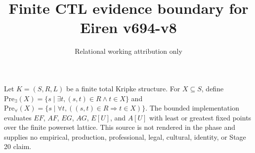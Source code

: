 \documentclass{article}
\title{Finite CTL evidence boundary for Eiren v694-v8}
\author{Relational working attribution only}
\begin{document}
\maketitle
Let $K=(S,R,L)$ be a finite total Kripke structure. For $X\subseteq S$, define $\mathrm{Pre}_{\exists}(X)=\{s\mid\exists t,(s,t)\in R\land t\in X\}$ and $\mathrm{Pre}_{\forall}(X)=\{s\mid\forall t,((s,t)\in R\Rightarrow t\in X)\}$. The bounded implementation evaluates $EF$, $AF$, $EG$, $AG$, $E[U]$, and $A[U]$ with least or greatest fixed points over the finite powerset lattice. This source is not rendered in the phase and supplies no empirical, production, professional, legal, cultural, identity, or Stage 20 claim.
\end{document}
